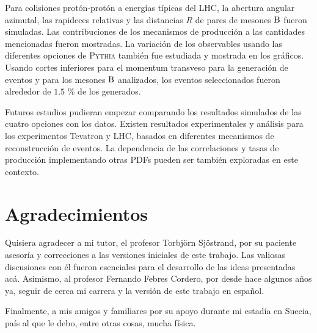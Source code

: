 \documentclass[a4paper,12pt]{article}
\begin{document}
Para colisiones protón-protón a energías típicas del LHC, la abertura angular azimutal, las rapideces relativas y las distancias $R$ de pares de mesones ${\mathrm B}$ fueron simuladas. Las contribuciones de los mecanismos de producción a las cantidades mencionadas fueron mostradas. La variación de los observables usando las diferentes opciones de \textsc{Pythia} también fue estudiada y mostrada en los gráficos. Usando cortes inferiores para el momentum transveso para la generación de eventos y para los mesones ${\mathrm B}$ analizados, los eventos seleccionados fueron alrededor de $1.5$ \% de los generados.

Futuros estudios pudieran empezar comparando los resultados simulados de las cuatro opciones con los datos. Existen resultados experimentales y análisis para los experimentos Tevatron y LHC, basados en diferentes mecanismos de reconstrucción de eventos. La dependencia de las correlaciones y tasas de producción  implementando otras PDFs pueden ser también exploradas en este contexto.



\section*{Agradecimientos}

Quisiera agradecer a mi tutor, el profesor Torbjörn Sjöstrand, por su paciente asesoría y correcciones a las versiones iniciales de este trabajo. Las valiosas discusiones con él fueron esenciales para el desarrollo de las ideas presentadas acá. Asimismo, al profesor Fernando Febres Cordero, por desde hace algunos años ya, seguir de cerca mi carrera y la versión de este trabajo en español.

Finalmente, a mis amigos y familiares por su apoyo durante mi estadía en Suecia, país al que le debo, entre otras cosas, mucha física.
\end{document}
